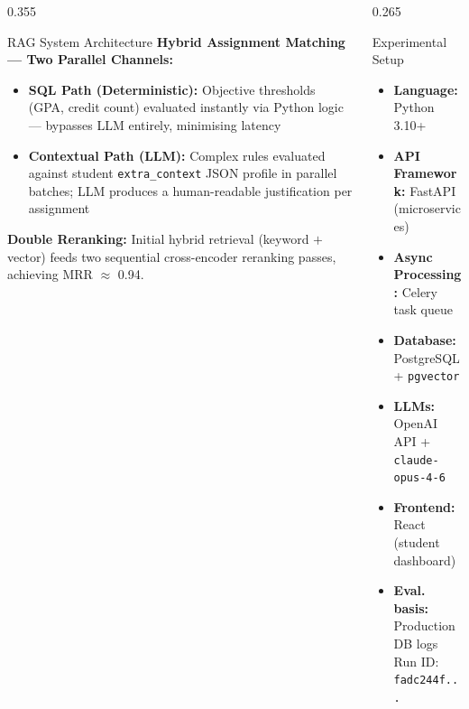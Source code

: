 \documentclass[final]{beamer}
\newcommand{\compactitem}{%
  \setlength{\itemsep}{4pt}%
  \setlength{\parskip}{0pt}%
  \setlength{\parsep}{0pt}%
  \setlength{\topsep}{2pt}%
}
\begin{document}
\begin{frame}[t]
\begin{columns}[T]
\begin{column}{0.355\paperwidth}
\begin{block}{RAG System Architecture}
\vskip0.25cm
\textbf{Hybrid Assignment Matching --- Two Parallel Channels:}
\begin{itemize}\compactitem
  \item \textbf{SQL Path (Deterministic):} Objective thresholds
        (GPA, credit count) evaluated instantly via Python
        logic --- bypasses LLM entirely, minimising latency
  \item \textbf{Contextual Path (LLM):} Complex rules evaluated
        against student \texttt{extra\_context} JSON profile
        in parallel batches; LLM produces a human-readable
        justification per assignment
\end{itemize}

\vskip0.25cm
\textbf{Double Reranking:} Initial hybrid retrieval (keyword
$+$ vector) feeds two sequential cross-encoder reranking
passes, achieving MRR $\approx$ 0.94.
\end{block}

\end{column}

\hskip0.40cm

\begin{column}{0.265\paperwidth}

\begin{block}{Experimental Setup}
\begin{itemize}\compactitem
  \item \textbf{Language:} Python 3.10+
  \item \textbf{API Framework:} FastAPI (microservices)
  \item \textbf{Async Processing:} Celery task queue
  \item \textbf{Database:} PostgreSQL + \texttt{pgvector}
  \item \textbf{LLMs:} OpenAI API +
        \texttt{claude-opus-4-6}
  \item \textbf{Frontend:} React (student dashboard)
  \item \textbf{Eval. basis:} Production DB logs\\
        Run ID: \texttt{fadc244f...}
\end{itemize}
\end{block}


\end{column}
\end{columns}
\end{frame}
\end{document}
